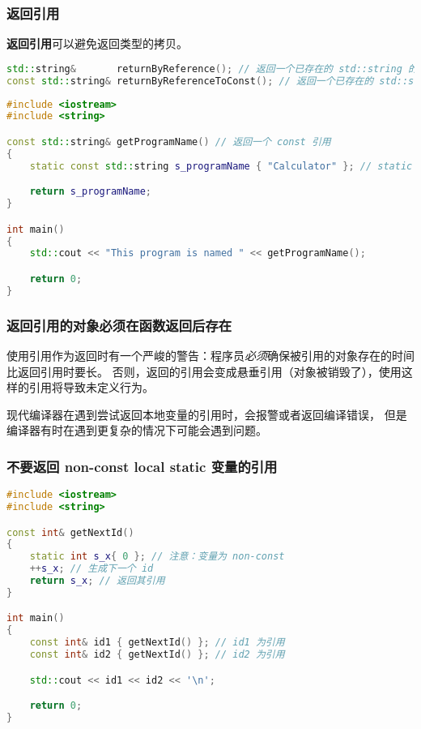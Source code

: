 \documentclass[../../LearnCpp.tex]{subfiles}
\begin{document}

\subsubsection*{返回引用}

\textbf{返回引用}可以避免返回类型的拷贝。

\begin{lstlisting}[language=C++]
std::string&       returnByReference(); // 返回一个已存在的 std::string 的引用（廉价）
const std::string& returnByReferenceToConst(); // 返回一个已存在的 std::string 的 const 引用（廉价）
\end{lstlisting}

\begin{lstlisting}[language=C++]
#include <iostream>
#include <string>

const std::string& getProgramName() // 返回一个 const 引用
{
    static const std::string s_programName { "Calculator" }; // static duration，在程序结束后销毁

    return s_programName;
}

int main()
{
    std::cout << "This program is named " << getProgramName();

    return 0;
}
\end{lstlisting}

\subsubsection*{返回引用的对象必须在函数返回后存在}

使用引用作为返回时有一个严峻的警告：程序员\textit{必须}确保被引用的对象存在的时间比返回引用时要长。
否则，返回的引用会变成悬垂引用（对象被销毁了），使用这样的引用将导致未定义行为。

现代编译器在遇到尝试返回本地变量的引用时，会报警或者返回编译错误，
但是编译器有时在遇到更复杂的情况下可能会遇到问题。

\subsubsection*{不要返回 non-const local static 变量的引用}

\begin{lstlisting}[language=C++]
#include <iostream>
#include <string>

const int& getNextId()
{
    static int s_x{ 0 }; // 注意：变量为 non-const
    ++s_x; // 生成下一个 id
    return s_x; // 返回其引用
}

int main()
{
    const int& id1 { getNextId() }; // id1 为引用
    const int& id2 { getNextId() }; // id2 为引用

    std::cout << id1 << id2 << '\n';

    return 0;
}
\end{lstlisting}
\end{document}
